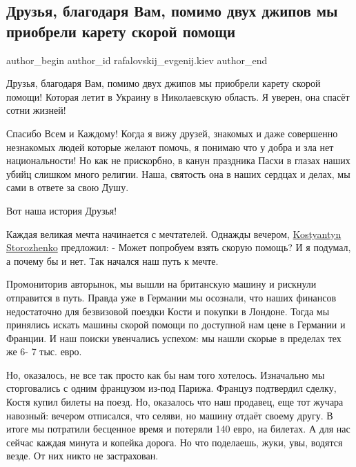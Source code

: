 
 
 
 
 
 
\subsection{Друзья, благодаря Вам, помимо двух джипов мы приобрели карету скорой помощи}
\label{sec:21_04_2022.fb.rafalovskij_evgenij.kiev.1.kareta_skoroj_pomoschi}
 
\ifcmt
 author_begin
   author_id rafalovskij_evgenij.kiev
 author_end
\fi

Друзья, благодаря Вам, помимо двух джипов мы приобрели карету скорой помощи!
Которая летит в Украину в Николаевскую область. Я уверен, она спасёт сотни
жизней!

Спасибо Всем и Каждому! Когда я вижу друзей, знакомых и даже совершенно
незнакомых людей которые желают помочь, я понимаю что  у добра и зла нет
национальности! Но как не прискорбно, в канун праздника Пасхи в глазах наших
убийц слишком много религии. Наша, святость она в наших сердцах и делах, мы
сами в ответе за свою Душу.

Вот наша история Друзья! 

Каждая великая мечта начинается с мечтателей. Однажды вечером,
\href{https://www.facebook.com/kostyantyn.storozhenko}{Kostyantyn Storozhenko}
предложил: - Может попробуем взять скорую помощь? И я подумал, а почему бы и
нет. Так начался наш путь к мечте.

Промониторив авторынок, мы вышли на британскую машину и рискнули отправится  в
путь. Правда уже в Германии мы осознали, что наших финансов недостаточно для
безвизовой поездки Кости и покупки в Лондоне. Тогда мы принялись искать  машины
скорой помощи по доступной нам цене в Германии и Франции. И наш поиски
увенчались успехом: мы нашли скорые в пределах тех же 6- 7 тыс. евро. 

Но, оказалось, не все так просто как бы нам того хотелось. Изначально мы
сторговались с одним французом из-под Парижа.  Француз подтвердил сделку,
Костя купил билеты на поезд. Но, оказалось что наш продавец, еще тот жучара
навозный:  вечером отписался, что селяви, но машину отдаёт своему другу.  В
итоге мы потратили бесценное время и потеряли 140 евро, на билетах. А для нас
сейчас  каждая минута и копейка дорога. Но что поделаешь, жуки, увы, водятся
везде. От них никто не застрахован. 

